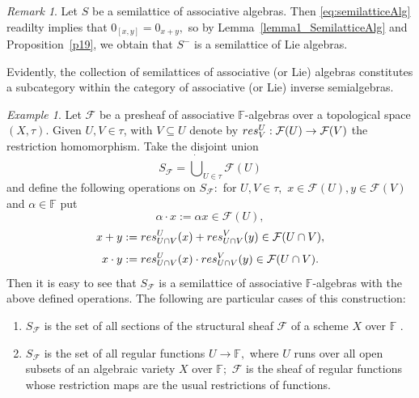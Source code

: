 \documentclass[10pt,a4paper]{amsart}
\theoremstyle{definition}
\theoremstyle{remark}
\newtheorem{rem}[thm]{Remark}
\newtheorem{ex}[thm]{Example}
\numberwithin{equation}{section}
\newtheorem*{Theorem A}{\textbf{Theorem A}}
\newtheorem*{Corollary E}{\textbf{Corollary E}}
\newtheorem*{Corollary F}{\textbf{Corollary F}}
\newtheorem*{Theorem B}{\textbf{Theorem B}}
\newtheorem*{Theorem C}{\textbf{Theorem C}}
\newtheorem*{Theorem D}{\textbf{Theorem B}}
\newtheorem*{p a}{\textbf{Proof of  Theorem A}}
\newtheorem*{p b}{\textbf{Proof of Theorem B}}
\newtheorem*{p c}{\textbf{Proof of  Theorem C}}
\newtheorem*{p d}{\textbf{Proof of  Theorem D}}
\newcommand{\0}{{\vartheta}}
\begin{document}
\begin{rem}\label{rem:AssocToLieSamillatAlg} Let  $S$ be a semilattice of associative algebras. Then 
 \eqref{eq:semilatticeAlg} readilty implies that  
 $0_{[x,y]} = 0_{x + y},$ so by 
 Lemma~\ref{lemma1_SemilatticeAlg} and  
 Proposition~\ref{p19}, we obtain that  $S^-$ is a semilattice of Lie algebras. 
\end{rem}

Evidently, the collection of semilattices of associative (or Lie) algebras constitutes a subcategory within the category of associative (or Lie) inverse semialgebras. 


\begin{ex}\label{example:Sheaves}
 Let $\mathcal F$ be a presheaf of associative $\mathbb{F}$-algebras over a topological space $(X, \tau).$  Given $U,V \in \tau$, with $V \subseteq U$ denote by  
${\textrm res}^U _{V}: \mathcal F (U) \to \mathcal F  (V)$ the restriction homomorphism. Take the  disjoint union
$$S_{\mathcal F} =    \dot{\bigcup}  _{U \in \tau} \mathcal F (U) $$ and define  the  following operations on $S_{\mathcal F}:$ for $U,V \in \tau ,$  $x\in \mathcal F (U), y \in \mathcal F (V)$ and  $\alpha \in \mathbb{F} $ put
$$\alpha \cdot x :=  
 \alpha  x \in {\mathcal F}(U),$$
 $$x+y :=  {\textrm res}^U _{U\cap V}(x) + 
 {\textrm res}^V _{U\cap V} (y) \in {\mathcal F}(U\cap V),$$
 $$x \cdot y :=  {\textrm res}^U _{U\cap V}(x) \cdot 
 {\textrm res}^V _{U\cap V} (y)\in {\mathcal F}(U\cap V).$$ Then it is easy to see that  $S_{\mathcal F} $  is a semilattice of associative $\mathbb{F}$-algebras with the above defined operations.
    The following are  particular cases of this construction: 
\begin{enumerate}
\item $S_{\mathcal F}$ is the  set  of all sections of the structural sheaf ${\mathcal F}$ of a scheme $X$ over  $\mathbb{F}$ .\\

\item  $S_{\mathcal F}$ is the  set  of all regular functions $U \to \mathbb{F},$ where $U$ runs over all open subsets of an algebraic variety $X$ over   $\mathbb{F};$ ${\mathcal F}$ is the sheaf of regular functions whose restriction maps are the usual restrictions of functions. \\


\end{enumerate}
\end{ex}
\end{document}
